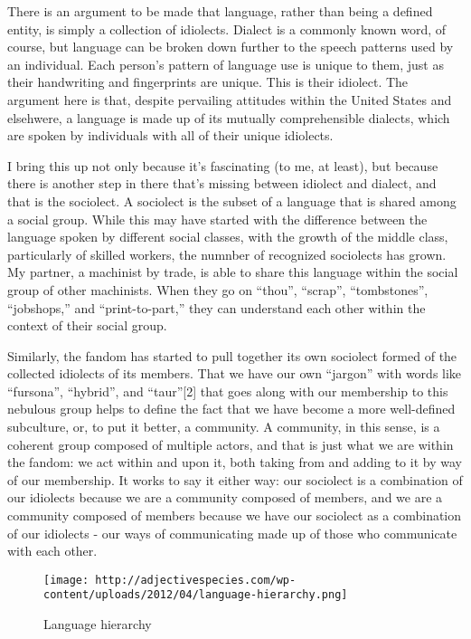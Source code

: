 There is an argument to be made that language, rather than being a
defined entity, is simply a collection of idiolects. Dialect is a
commonly known word, of course, but language can be broken down further
to the speech patterns used by an individual. Each person's pattern of
language use is unique to them, just as their handwriting and
fingerprints are unique. This is their idiolect. The argument here is
that, despite pervailing attitudes within the United States and
elsehwere, a language is made up of its mutually comprehensible
dialects, which are spoken by individuals with all of their unique
idiolects.

I bring this up not only because it's fascinating (to me, at least), but
because there is another step in there that's missing between idiolect
and dialect, and that is the sociolect. A sociolect is the subset of a
language that is shared among a social group. While this may have
started with the difference between the language spoken by different
social classes, with the growth of the middle class, particularly of
skilled workers, the numnber of recognized sociolects has grown. My
partner, a machinist by trade, is able to share this language within the
social group of other machinists. When they go on ``thou'', ``scrap'',
``tombstones'', ``jobshops,'' and ``print-to-part,'' they can understand
each other within the context of their social group.

Similarly, the fandom has started to pull together its own sociolect
formed of the collected idiolects of its members. That we have our own
``jargon'' with words like ``fursona'', ``hybrid'', and ``taur''{[}2{]}
that goes along with our membership to this nebulous group helps to
define the fact that we have become a more well-defined subculture, or,
to put it better, a community. A community, in this sense, is a coherent
group composed of multiple actors, and that is just what we are within
the fandom: we act within and upon it, both taking from and adding to it
by way of our membership. It works to say it either way: our sociolect
is a combination of our idiolects because we are a community composed of
members, and we are a community composed of members because we have our
sociolect as a combination of our idiolects - our ways of communicating
made up of those who communicate with each other.

\begin{figure}[htbp]
\centering
\texttt{[image: http://adjectivespecies.com/wp-content/uploads/2012/04/language-hierarchy.png]}
\caption{Language hierarchy}
\end{figure}

